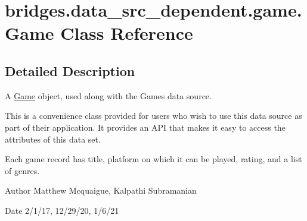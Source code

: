 \hypertarget{classbridges_1_1data__src__dependent_1_1game_1_1_game}{}\section{bridges.\+data\+\_\+src\+\_\+dependent.\+game.\+Game Class Reference}
\label{classbridges_1_1data__src__dependent_1_1game_1_1_game}


\subsection{Detailed Description}
A \hyperlink{classbridges_1_1data__src__dependent_1_1game_1_1_game}{Game} object, used along with the Games data source. 

This is a convenience class provided for users who wish to use this data source as part of their application. It provides an A\+PI that makes it easy to access the attributes of this data set.

Each game record has title, platform on which it can be played, rating, and a list of genres.

\begin{DoxyAuthor}{Author}
Matthew Mcquaigue, Kalpathi Subramanian 
\end{DoxyAuthor}
\begin{DoxyDate}{Date}
2/1/17, 12/29/20, 1/6/21 
\end{DoxyDate}
